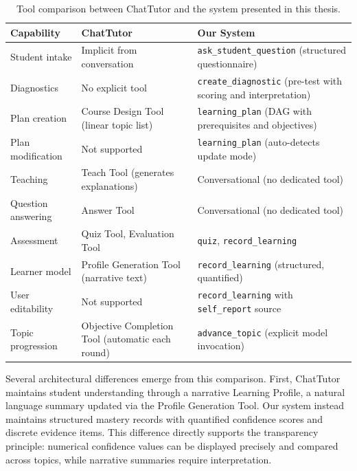\documentclass[logo,bsc,singlespacing,parskip,online]{infthesis}
\begin{document}
\begin{table}[ht]
\centering
\caption{Tool comparison between ChatTutor and the system presented in this thesis.}
\label{tab:chatttutor-comparison}
\begin{tabular}{lp{4.5cm}p{4.5cm}}
\toprule
\textbf{Capability} & \textbf{ChatTutor} & \textbf{Our System} \\
\midrule
Student intake & Implicit from conversation & \texttt{ask\_student\_question} (structured questionnaire) \\
\midrule
Diagnostics & No explicit tool & \texttt{create\_diagnostic} (pre-test with scoring and interpretation) \\
\midrule
Plan creation & Course Design Tool (linear topic list) & \texttt{learning\_plan} (DAG with prerequisites and objectives) \\
\midrule
Plan modification & Not supported & \texttt{learning\_plan} (auto-detects update mode) \\
\midrule
Teaching & Teach Tool (generates explanations) & Conversational (no dedicated tool) \\
\midrule
Question answering & Answer Tool & Conversational (no dedicated tool) \\
\midrule
Assessment & Quiz Tool, Evaluation Tool & \texttt{quiz}, \texttt{record\_learning} \\
\midrule
Learner model & Profile Generation Tool (narrative text) & \texttt{record\_learning} (structured, quantified) \\
\midrule
User editability & Not supported & \texttt{record\_learning} with \texttt{self\_report} source \\
\midrule
Topic progression & Objective Completion Tool (automatic each round) & \texttt{advance\_topic} (explicit model invocation) \\
\bottomrule
\end{tabular}
\end{table}

Several architectural differences emerge from this comparison. First, ChatTutor maintains student understanding through a narrative Learning Profile, a natural language summary updated via the Profile Generation Tool. Our system instead maintains structured mastery records with quantified confidence scores and discrete evidence items. This difference directly supports the transparency principle: numerical confidence values can be displayed precisely and compared across topics, while narrative summaries require interpretation.
\end{document}
